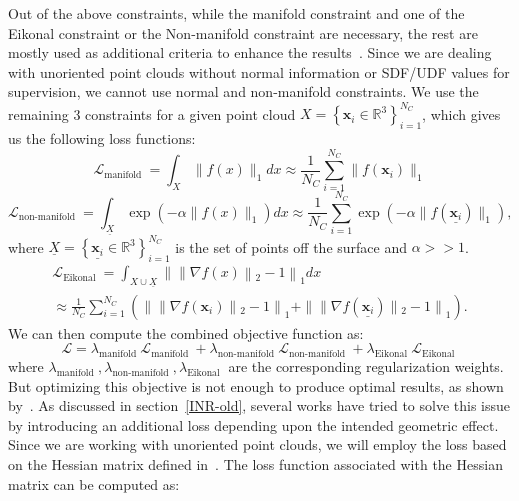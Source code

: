 Out of the above constraints, while the manifold constraint and one of the Eikonal constraint or the Non-manifold constraint are necessary, the rest are mostly used as additional criteria to enhance the results~\cite{DiGS}. Since we are dealing with unoriented point clouds without normal information or SDF/UDF values for supervision, we cannot use normal and non-manifold constraints. We use the remaining 3 constraints for a given point cloud $X=\left\{\mathbf{x}_{i} \in \mathbb{R}^{3}\right\}_{i=1}^{N_C}$, which gives us the following loss functions:
\begin{equation}\label{manifold_sdf}
    \mathcal{L}_{\text {manifold }}=\int_{X}\|f(x)\|_{1} d x \approx \frac{1}{N_C}\sum_{i=1}^{N_C}\|f(\mathbf{x}_i)\|_1
\end{equation}
\begin{equation}\label{non_manifold_sdf}
    \mathcal{L}_{\text {non-manifold }}=\int_{\underline{X}} \exp \left(-\alpha\|f(x)\|_{1}\right) d x \approx \frac{1}{N_C}\sum_{i=1}^{N_C} \exp \left(-\alpha\|f(\underline{\mathbf{x}_i})\|_1\right),
\end{equation}
where $\underline{X}=\left\{\underline{\mathbf{x}_i} \in \mathbb{R}^{3}\right\}_{i=1}^{N_C}$ is the set of points off the surface and $\alpha>>1$.
\begin{equation}\label{Eikonal}
     \begin{aligned}
         \mathcal{L}_{\text {Eikonal }}=\int_{X \cup \underline{X}} \| \| \nabla f(x)\left\|_{2}-1\right\|_{1} d x \\
         \approx \frac{1}{N_C}\sum_{i=1}^{N_C} \left(\| \| \nabla f(\mathbf{x}_i)\left\|_{2}-1\right\|_{1} + \| \| \nabla f(\underline{\mathbf{x}_i})\left\|_{2}-1\right\|_{1} \right).
     \end{aligned}
\end{equation}
We can then compute the combined objective function as:
\begin{equation}
    \mathcal{L}= \lambda_{\text {manifold }} \mathcal{L}_{\text {manifold }}+\lambda_{\text {non-manifold }} \mathcal{L}_{\text {non-manifold }}+ \lambda_{\text {Eikonal }} \mathcal{L}_{\text {Eikonal }}
\end{equation}
where $\lambda_{\text {manifold }}, \lambda_{\text {non-manifold }}, \lambda_{\text {Eikonal }}$ are the corresponding regularization weights. But optimizing this objective is not enough to produce
optimal results, as shown by~\cite{DiGS, NeuralHessian}. As discussed in section~\ref{INR-old}, several works have tried to solve this issue by introducing an additional loss depending upon the intended geometric effect. Since we are working with unoriented point clouds, we will employ the loss based on the Hessian matrix defined in~\cite{NeuralHessian}. The loss function associated with the Hessian matrix can be computed as:
